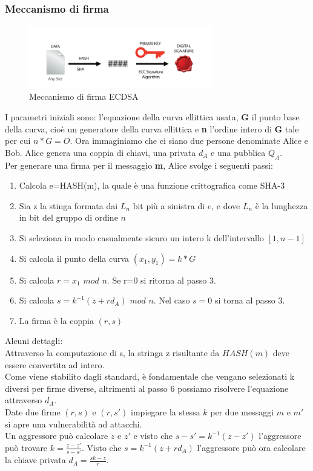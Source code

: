 \documentclass[a4paper,11pt]{report}
\begin{document}
\subsubsection{Meccanismo di firma}
\begin{figure}[htbp] 
\begin{center}
\includegraphics[width=8cm]{img/s.png} 
\end{center}
\caption{Meccanismo di firma ECDSA \cite{SHA}}
\end{figure}
I parametri iniziali sono: l'equazione della curva ellittica usata, \textbf{G} il punto base della curva, cioè un generatore della curva ellittica e \textbf{n} l'ordine intero di \textbf{G} tale per cui $n*G=O$. Ora immaginiamo che ci siano due persone denominate Alice e Bob.  Alice genera una coppia di chiavi, una privata \textbf{$d_{A}$} e una pubblica \textbf{$Q_{A}$}.\\ Per generare una firma per il messaggio \textbf{m}, Alice svolge i seguenti passi:
\begin{enumerate}
\item Calcola e=HASH(m), la quale è una funzione crittografica come SHA-3
\item Sia z la stinga formata dai $L_{n}$ bit più a sinistra di $e$, e dove $L_{n}$ è la lunghezza in bit del gruppo di ordine $n$
\item Si seleziona in modo casualmente sicuro un intero k dell'intervallo $[1,n-1]$
\item Si calcola il punto della curva $(x_{1},y_{1}) = k*G$
\item Si calcola $r=x_{1}$ $mod$ $n$. Se r=0 si ritorna al passo 3.
\item Si calcola $s=k^{-1}(z+rd_{A})$ $mod$ $n$. Nel caso $s=0$ si torna al passo 3.
\item La firma è la coppia $(r,s)$ 
\end{enumerate}

Alcuni dettagli:\\
Attraverso la computazione di s, la stringa z risultante da $HASH(m)$ deve essere convertita ad intero.\\
Come viene stabilito dagli standard, è fondamentale che vengano selezionati k diversi per firme diverse, altrimenti al passo 6 possiamo risolvere l'equazione attraverso $d_{A}$.\\
Date due firme $(r,s)$ e $(r,s')$ impiegare la stessa $k$ per due messaggi $m$ e $m'$ si apre una vulnerabilità ad attacchi.\\
Un aggressore può calcolare $z$ e $z'$ e visto che $s-s'=k^{-1}(z-z')$ l'aggressore può trovare $k=\frac{z-z'}{s-s'}$. Visto che $s=k^{-1}(z+rd_{A})$ l'aggressore può ora calcolare la chiave privata $d_{A}=\frac{sk-z}{r}$.
\end{document}
